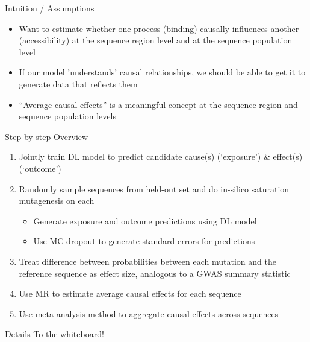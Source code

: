 \documentclass[pdf]{beamer} %
\begin{document}
\begin{frame}[t]{Intuition / Assumptions}
    \begin{itemize}
        \item Want to estimate whether one process (binding) causally influences another (accessibility) at the sequence region level and at the sequence population level
        \item If our model 'understands' causal relationships, we should be able to get it to generate data that reflects them
        \item ``Average causal effects'' is a meaningful concept at the sequence region and sequence population levels
    \end{itemize}
\end{frame}

\begin{frame}[t]{Step-by-step Overview}
    \begin{enumerate}
        \item Jointly train DL model to predict candidate cause(s) (`exposure') \& effect(s) (`outcome')
        \item Randomly sample sequences from held-out set and do in-silico saturation mutagenesis on each
            \begin{itemize}
                \item Generate exposure and outcome predictions using DL model
                \item Use MC dropout to generate standard errors for predictions
            \end{itemize}
        \item Treat difference between probabilities between each mutation and the reference sequence as effect size, analogous to a GWAS summary statistic
        \item Use MR to estimate average causal effects for each sequence
        \item Use meta-analysis method to aggregate causal effects across sequences
    \end{enumerate}
\end{frame}

\begin{frame}[t]{Details}
    To the whiteboard!
\end{frame}
\end{document}
